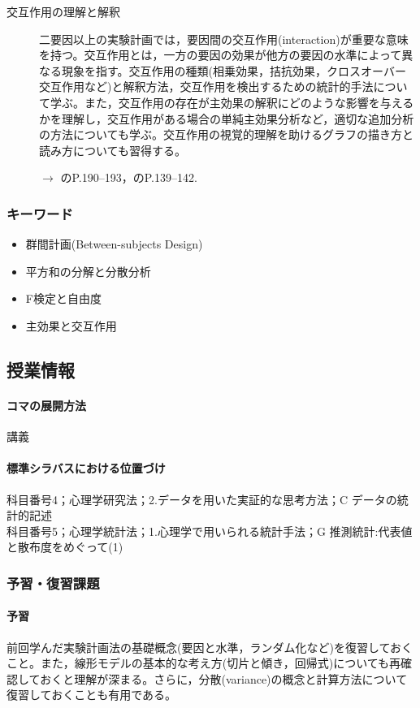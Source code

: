 \begin{description}
	\item[交互作用の理解と解釈] 二要因以上の実験計画では，要因間の交互作用(interaction)が重要な意味を持つ。交互作用とは，一方の要因の効果が他方の要因の水準によって異なる現象を指す。交互作用の種類(相乗効果，拮抗効果，クロスオーバー交互作用など)と解釈方法，交互作用を検出するための統計的手法について学ぶ。また，交互作用の存在が主効果の解釈にどのような影響を与えるかを理解し，交互作用がある場合の単純主効果分析など，適切な追加分析の方法についても学ぶ。交互作用の視覚的理解を助けるグラフの描き方と読み方についても習得する。
	      \begin{flushright}
		      $\to$ \textcite{Yamada2004}のP.190--193，\textcite{kosugi2019}のP.139--142.
	      \end{flushright}


\end{description}
\subsubsection{キーワード}
\begin{itemize}
	\item 群間計画(Between-subjects Design)
	\item 平方和の分解と分散分析
	\item F検定と自由度
	\item 主効果と交互作用
\end{itemize}
\subsection{授業情報}
\paragraph{コマの展開方法}
講義
\paragraph{標準シラバスにおける位置づけ}
科目番号4；心理学研究法；2.データを用いた実証的な思考方法；C データの統計的記述\\
科目番号5；心理学統計法；1.心理学で用いられる統計手法；G 推測統計:代表値と散布度をめぐって(1)
\subsubsection{予習・復習課題}
\paragraph{予習}
前回学んだ実験計画法の基礎概念(要因と水準，ランダム化など)を復習しておくこと。また，線形モデルの基本的な考え方(切片と傾き，回帰式)についても再確認しておくと理解が深まる。さらに，分散(variance)の概念と計算方法について復習しておくことも有用である。

